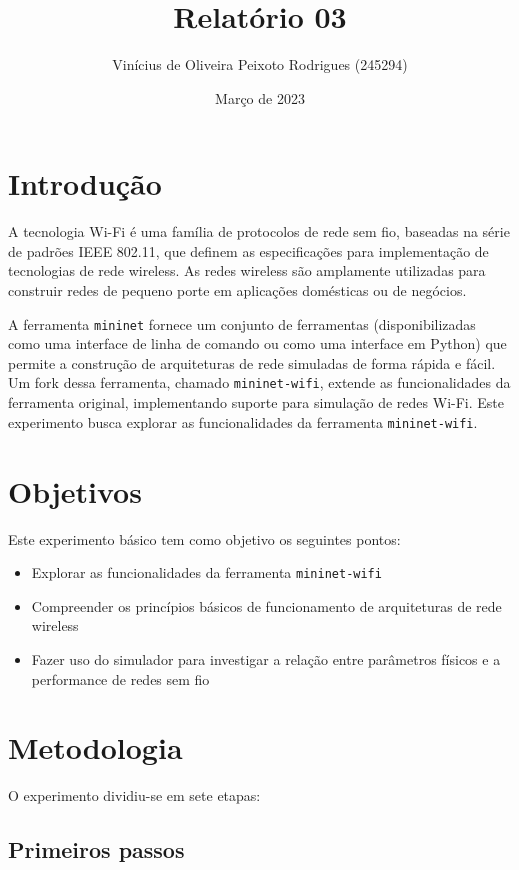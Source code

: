 \documentclass{article}
\title{Relatório 03}
\author{Vinícius de Oliveira Peixoto Rodrigues (245294)}
\date{Março de 2023}
\begin{document}
\maketitle

\section{Introdução}

A tecnologia Wi-Fi é uma família de protocolos de rede sem fio, baseadas
na série de padrões IEEE 802.11, que definem as especificações para implementação
de tecnologias de rede wireless. As redes wireless são amplamente utilizadas para
construir redes de pequeno porte em aplicações domésticas ou de negócios.

A ferramenta \texttt{mininet} fornece um conjunto de ferramentas (disponibilizadas
como uma interface de linha de comando ou como uma interface em Python) que permite
a construção de arquiteturas de rede simuladas de forma rápida e fácil. Um fork dessa
ferramenta, chamado \texttt{mininet-wifi}, extende as funcionalidades da ferramenta
original, implementando suporte para simulação de redes Wi-Fi. Este experimento
busca explorar as funcionalidades da ferramenta \texttt{mininet-wifi}.

\section{Objetivos}

Este experimento básico tem como objetivo os seguintes pontos:

\begin{itemize}
    \item Explorar as funcionalidades da ferramenta \texttt{mininet-wifi}
    \item Compreender os princípios básicos de funcionamento de arquiteturas
          de rede wireless
    \item Fazer uso do simulador para investigar a relação entre parâmetros
          físicos e a performance de redes sem fio
\end{itemize}

\section{Metodologia}

O experimento dividiu-se em sete etapas:

\subsection{Primeiros passos}
\end{document}
